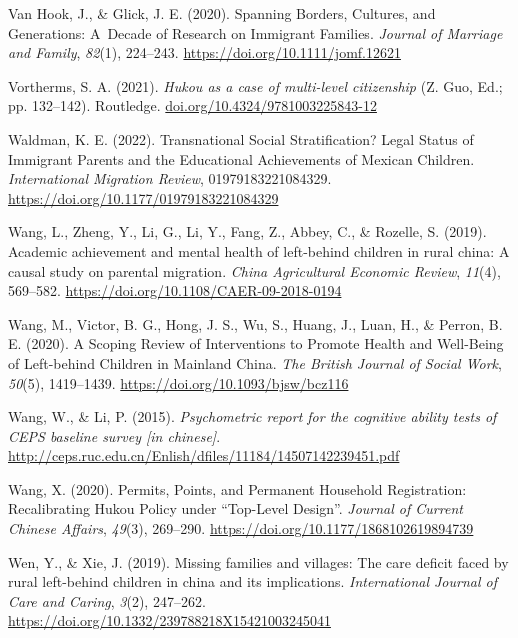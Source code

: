 \documentclass[
  man,floatsintext]{apa7}
\newlength{\cslhangindent}
\newlength{\cslentryspacingunit} %
\newenvironment{CSLReferences}[2] %
 {%
  \setlength{\parindent}{0pt}
  \ifodd #1
  \let\oldpar\par
  \def\par{\hangindent=\cslhangindent\oldpar}
  \fi
  \setlength{\parskip}{#2\cslentryspacingunit}
 }%
 {}
\begin{document}
\begin{CSLReferences}{1}{0}
\leavevmode{}%
Van Hook, J., \& Glick, J. E. (2020). Spanning Borders, Cultures, and Generations: A~Decade of Research on Immigrant Families. \emph{Journal of Marriage and Family}, \emph{82}(1), 224--243. \url{https://doi.org/10.1111/jomf.12621}

\leavevmode{}%
Vortherms, S. A. (2021). \emph{Hukou as a case of multi-level citizenship} (Z. Guo, Ed.; pp. 132--142). Routledge. \href{https://doi.org/10.4324/9781003225843-12}{doi.org/10.4324/9781003225843-12}

\leavevmode{}%
Waldman, K. E. (2022). Transnational Social Stratification? Legal Status of Immigrant Parents and the Educational Achievements of Mexican Children. \emph{International Migration Review}, 01979183221084329. \url{https://doi.org/10.1177/01979183221084329}

\leavevmode{}%
Wang, L., Zheng, Y., Li, G., Li, Y., Fang, Z., Abbey, C., \& Rozelle, S. (2019). Academic achievement and mental health of left-behind children in rural china: A causal study on parental migration. \emph{China Agricultural Economic Review}, \emph{11}(4), 569--582. \url{https://doi.org/10.1108/CAER-09-2018-0194}

\leavevmode{}%
Wang, M., Victor, B. G., Hong, J. S., Wu, S., Huang, J., Luan, H., \& Perron, B. E. (2020). A Scoping Review of Interventions to Promote Health and Well-Being of Left-behind Children in Mainland China. \emph{The British Journal of Social Work}, \emph{50}(5), 1419--1439. \url{https://doi.org/10.1093/bjsw/bcz116}

\leavevmode{}%
Wang, W., \& Li, P. (2015). \emph{Psychometric report for the cognitive ability tests of CEPS baseline survey {[}in chinese{]}}. \url{http://ceps.ruc.edu.cn/Enlish/dfiles/11184/14507142239451.pdf}

\leavevmode{}%
Wang, X. (2020). Permits, Points, and Permanent Household Registration: Recalibrating Hukou Policy under {``}Top-Level Design{''}. \emph{Journal of Current Chinese Affairs}, \emph{49}(3), 269--290. \url{https://doi.org/10.1177/1868102619894739}

\leavevmode{}%
Wen, Y., \& Xie, J. (2019). Missing families and villages: The care deficit faced by rural left-behind children in china and its implications. \emph{International Journal of Care and Caring}, \emph{3}(2), 247--262. \url{https://doi.org/10.1332/239788218X15421003245041}


\end{CSLReferences}
\end{document}
